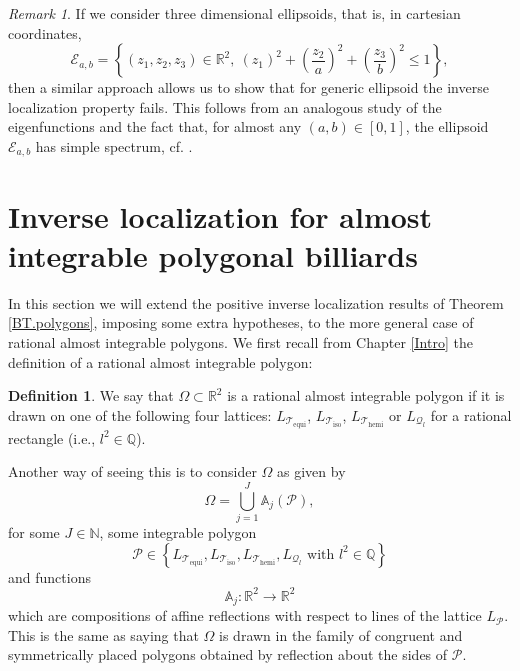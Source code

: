 \documentclass{amsart}
\theoremstyle{definition}
\newtheorem{definition}[theorem]{Definition}
\theoremstyle{remark}
\newtheorem{remark}[theorem]{Remark}
\def\RR{\mathbb{R}}
\renewcommand\leq\leqslant
\numberwithin{equation}{section}
\theoremstyle{definition}
\theoremstyle{remark}
\def\RR{\mathbb{R}}
\begin{document}
\begin{remark}
If we consider three dimensional ellipsoids, that is,
in cartesian coordinates,  \begin{equation}
	\mathcal{E}_{a,b}=\left\{(z_1,z_2,z_3)\in\mathbb{R}^{2},\ \left(z_1\right)^2+\left(\frac{z_2}{a}\right)^2+\left(\frac{z_3}{b}\right)^2\leq 1\right\},
\end{equation} then a similar approach allows us to show that for generic ellipsoid the inverse localization property fails. This follows from an analogous study of the eigenfunctions and the fact that, for almost any $(a,b)\in [0,1]$, the ellipsoid $\mathcal{E}_{a,b}$ has simple spectrum, cf. \cite[Theorem 7.3]{Hil}.
\end{remark}

\section{Inverse localization for almost integrable polygonal billiards}\label{ILtil}
In this section we will extend the positive inverse localization results of Theorem \ref{BT.polygons}, imposing some extra hypotheses, to the more general case of rational almost integrable polygons. We first recall from Chapter \ref{Intro} the definition of a rational almost integrable polygon: 
\begin{definition}
	We say that $\Omega\subset\RR^2$ is a rational almost integrable polygon if it is drawn on one of the following four lattices:  $L_{\mathcal{T}_{\mathrm{equi}}}$, $L_{\mathcal{T}_{\mathrm{iso}}}$,  $L_{\mathcal{T}_{\mathrm{hemi}}}$ or $L_{\mathcal{Q}_{l}}$ for a rational rectangle 
	(i.e., $l^2\in\mathbb{Q}$).
\end{definition}

 Another way of seeing this is to consider $\Omega$ as given by \begin{equation}
	\Omega=\bigcup_{j=1}^J\mathbb{A}_j\left(\mathcal{P}\right),
\end{equation}for some $J\in\mathbb{N}$, some integrable polygon \begin{equation}\mathcal{P}\in\left\{L_{\mathcal{T}_{\mathrm{equi}}}, L_{\mathcal{T}_{\mathrm{iso}}},  L_{\mathcal{T}_{\mathrm{hemi}}}, L_{\mathcal{Q}_{l}}\text{ with } l^2\in\mathbb{Q}\right\}\end{equation}  and functions \begin{equation}
	\mathbb{A}_j:\mathbb{R}^{2}\rightarrow\mathbb{R}^{2}
\end{equation}which are compositions of affine reflections with respect to lines of the lattice $L_\mathcal{P}$. This is the same as saying that $\Omega$ is drawn in the family of congruent and symmetrically placed polygons obtained
by reflection about the sides of $\mathcal{P}$.
\end{document}

